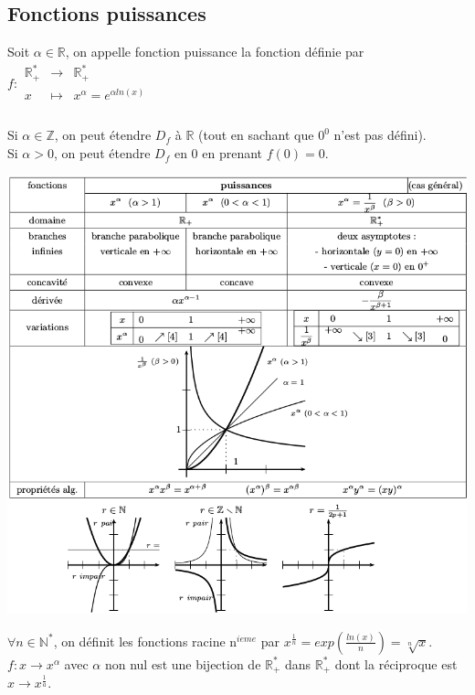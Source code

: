 \documentclass[a4paper,10pt]{book}
\newcommand{\R}{\mathbb{R}}
\newcommand{\Rpe}{\mathbb{R}_{+}^{*}}
\newcommand{\N}{\mathbb{N}}
\newcommand{\Z}{\mathbb{Z}}
\begin{document}
\newpage
\subsection{Fonctions puissances}
Soit $\alpha \in \R$, on appelle fonction puissance la fonction définie par $f : \begin{array}{rcl} \Rpe &\longrightarrow &\Rpe\\
x &\longmapsto & x^{\alpha}=e^{\alpha ln(x)}\\ \end{array} $\\ \\
Si $\alpha \in \Z$, on peut étendre $D_{f}$ à $\R$ (tout en sachant que $0^{0}$ n'est pas défini).\\
Si $\alpha >0$, on peut étendre $D_{f}$ en 0 en prenant $f(0)=0$.

\begin{center}
\includegraphics[scale=0.6]{images/005.png}
\end{center}

$\forall n \in \N^{*}$, on définit les fonctions racine n$^{ieme}$ par $x^{\frac{1}{n}}=exp(\frac{ln(x)}{n})=\sqrt[n]{x}$.\\

$f : x \longrightarrow x^{\alpha}$ avec $\alpha$ non nul est une bijection de $\Rpe$ dans $\Rpe$ dont la réciproque est $x \longrightarrow x^{\frac{1}{a}}$.\\\\
\end{document}
